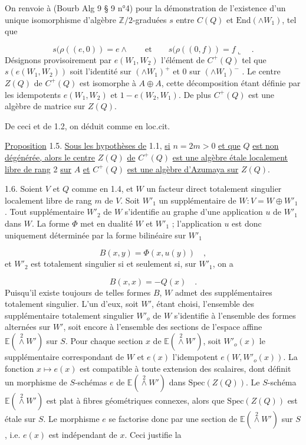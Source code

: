 On renvoie à (Bourb Alg 9 § 9 n°4) pour la démonstration de l'existence d'un unique isomorphisme d'algèbre $\mathbb{Z}/2$-graduées $s$ entre $C(Q)$ et $\mathrm{End}(\wedge W_1)$, tel que

\begin{equation*}
s(\rho((e,0)) = e \wedge \qquad \mbox{et} \qquad s(\rho((0,f)) = f \llcorner \quad .
\end{equation*}
Désignons provisoirement par $e(W_1,W_2)$ l'élément de $C^+(Q)$ tel que $s(e(W_1,W_2))$ soit l'identité sur $(\wedge W_1)^+$ et $0$ sur $(\wedge W_1)^-$ . Le centre $Z(Q)$ de $C^+(Q)$ est isomorphe à $A \oplus A$, cette décomposition étant définie par les idempotents $e(W_1,W_2)$ et $1 - e(W_2,W_1)$. De plus $C^+(Q)$ est une algèbre de matrice sur $Z(Q)$.

De ceci et de 1.2, on déduit comme en loc.cit.

\underline{Proposition} 1.5. \underline{Sous les hypothèses de} 1.1, \underline{si} $n = 2m > 0$ \underline{et que} $Q$ \underline{est non dégénérée, alors le centre} $Z(Q)$ \underline{de} $C^+(Q)$ \underline{est une algèbre étale localement libre de rang} 2 \underline{sur} $A$ \underline{et} $C^+(Q)$ \underline{est une algèbre d'Azumaya sur} $Z(Q)$.

1.6. Soient $V$ et $Q$ comme en 1.4, et $W$ un facteur direct totalement singulier localement libre de rang $m$ de $V$. Soit $W'_1$ un supplémentaire de $W : V = W \oplus W'_1$ . Tout supplémentaire $W'_2$ de $W$ s'identifie au graphe d'une application $u$ de $W'_1$ dans $W$. La forme $\Phi$ met en dualité $W$ et $W'_1$ ; l'application $u$ est donc uniquement déterminée par la forme bilinéaire sur $W'_1$ 



\begin{equation*}
 B(x,y) = \Phi(x,u(y)) \quad ,
\end{equation*}
et $W'_2$ est totalement singulier si et seulement si, sur $W'_1$, on a

\begin{equation*}
B(x,x) = - Q(x) \quad .
\end{equation*}
Puisqu'il existe toujours de telles formes $B$, $W$ admet des supplémentaires totalement singulier. L'un d'eux, soit $W'$, étant choisi, l'ensemble des supplémentaire totalement singulier $W'_o$ de $W$ s'identifie à l'ensemble des formes alternées sur $W'$, soit encore à l'ensemble des sections de l'espace affine $\mathbb{E}(\overset{2}{\wedge} W')$ sur $S$. Pour chaque section $x$ de $\mathbb{E}(\overset{2}{\wedge} W')$, soit $W'_o(x)$ le supplémentaire correspondant de $W$ et $e(x)$ l'idempotent $e(W, W'_o(x))$. La fonction $x \longmapsto e(x)$ est compatible à toute extension des scalaires, dont définit un morphisme de $S$-schémas $e$ de $\mathbb{E}(\overset{2}{\wedge} W')$ dans $\mathrm{Spec}(Z(Q))$. Le $S$-schéma $\mathbb{E}(\overset{2}{\wedge} W')$ est plat à fibres géométriques connexes, alors que $\mathrm{Spec}(Z(Q))$ est étale sur $S$. Le morphisme $e$ se factorise donc par une section de $\mathbb{E}(\overset{2}{\wedge} W')$ sur $S$, i.e. $e(x)$ est indépendant de $x$. Ceci justifie la

